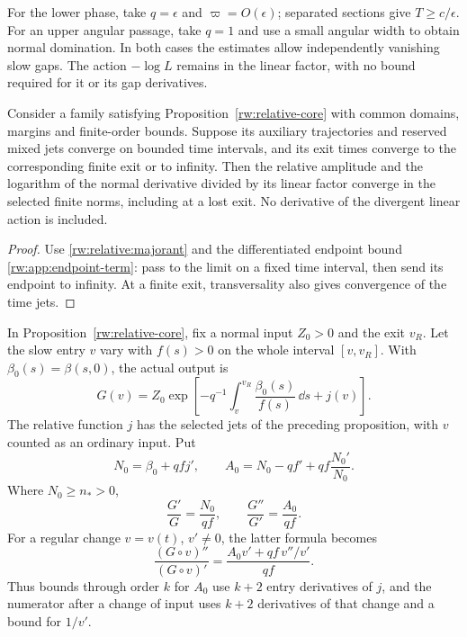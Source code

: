 For the lower phase, take $q=\epsilon$ and
$\varpi=O(\epsilon)$; separated sections give $T\ge c/\epsilon$.
For an upper angular passage, take $q=1$ and use a small angular
width to obtain normal domination.  In both cases the estimates allow
independently vanishing slow gaps.  The action $-\log L$ remains in
the linear factor, with no bound required for it or its gap derivatives.

\begin{corollary}
\label{rw:transitions:relative-continuity}
Consider a family satisfying Proposition~\ref{rw:relative-core}
with common domains, margins and finite-order bounds. Suppose its
auxiliary trajectories and reserved mixed jets converge on bounded
time intervals, and its exit times converge to the corresponding
finite exit or to infinity. Then the relative amplitude and the
logarithm of the normal derivative divided by its linear factor
converge in the selected finite norms, including at a lost exit.
No derivative of the divergent linear action is included.
\end{corollary}
\begin{proof}
Use \eqref{rw:relative:majorant} and the differentiated endpoint bound
\eqref{rw:app:endpoint-term}: pass to the limit on a fixed time interval,
then send its endpoint to infinity. At a finite exit, transversality
also gives convergence of the time jets.
\end{proof}

\begin{lemma}\label{rw:transitions:moving-rate}
In Proposition~\ref{rw:relative-core}, fix a normal input $Z_0>0$ and
the exit $v_R$. Let the slow entry $v$ vary with
$f(s)>0$ on the whole interval $[v,v_R]$. With
$\beta_0(s)=\beta(s,0)$, the actual output is
\begin{equation}\label{rw:relative:moving-output}
 G(v)=Z_0\exp\left[-q^{-1}\int_v^{v_R}
                    \frac{\beta_0(s)}{f(s)}\,\dd s+j(v)\right].
\end{equation}
The relative function $j$ has the selected jets of the preceding
proposition, with $v$ counted as an ordinary input. Put
\begin{equation}\label{rw:relative:rates}
 N_0=\beta_0+qf j',\qquad
 A_0=N_0-qf'+qf\frac{N_0'}{N_0}.
\end{equation}
Where $N_0\ge n_*>0$,
\[
 \frac{G'}G=\frac{N_0}{qf},\qquad
 \frac{G''}{G'}=\frac{A_0}{qf}.
\]
For a regular change $v=v(t)$, $v'\ne0$, the latter formula becomes
\begin{equation}\label{rw:relative:curvature-rate}
 \frac{(G\circ v)''}{(G\circ v)'}
 =\frac{A_0v'+qf\,v''/v'}{qf}.
\end{equation}
Thus bounds through order $k$ for $A_0$ use $k+2$ entry derivatives
of $j$, and the numerator after a change of input uses $k+2$
derivatives of that change and a bound for $1/v'$.
\end{lemma}

